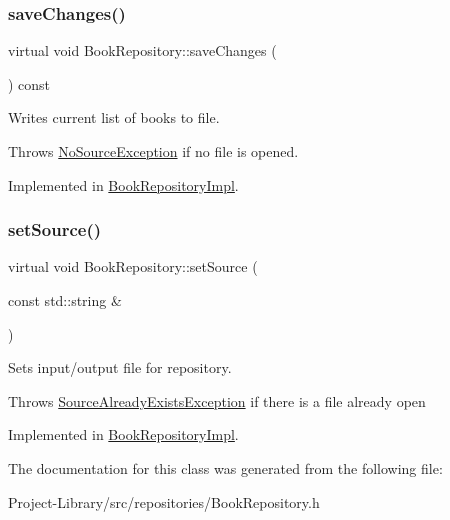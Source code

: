 \mbox{\label{classBookRepository_a943be98eae0c0d4b3b453284a39653c3}} 
\subsubsection{\texorpdfstring{save\+Changes()}{saveChanges()}}
{\footnotesize\ttfamily virtual void Book\+Repository\+::save\+Changes (\begin{DoxyParamCaption}{ }\end{DoxyParamCaption}) const\hspace{0.3cm}{\ttfamily [pure virtual]}}

Writes current list of books to file.

Throws \hyperlink{structNoSourceException}{No\+Source\+Exception} if no file is opened. 

Implemented in \hyperlink{classBookRepositoryImpl_a1c28f61a8981b52aa45ca1b11ef0e099}{Book\+Repository\+Impl}.

\mbox{\label{classBookRepository_af4ffa5253ce6cd4e0e2d24d32090daab}} 
\subsubsection{\texorpdfstring{set\+Source()}{setSource()}}
{\footnotesize\ttfamily virtual void Book\+Repository\+::set\+Source (\begin{DoxyParamCaption}\item[{const std\+::string \&}]{ }\end{DoxyParamCaption})\hspace{0.3cm}{\ttfamily [pure virtual]}}

Sets input/output file for repository.

Throws \hyperlink{structSourceAlreadyExistsException}{Source\+Already\+Exists\+Exception} if there is a file already open 

Implemented in \hyperlink{classBookRepositoryImpl_aea4f6c50587d26ba6bf4bbfd41001dfd}{Book\+Repository\+Impl}.



The documentation for this class was generated from the following file\+:\begin{DoxyCompactItemize}
\item 
Project-\/\+Library/src/repositories/Book\+Repository.\+h\end{DoxyCompactItemize}
